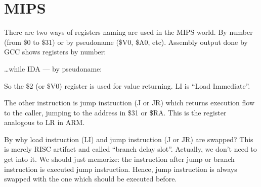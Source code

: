 
\ifdefined\IncludeMIPS
\ifx\RUSSIAN\undefined
\section{MIPS}

\label{MIPS_leaf_function_ex1}
There are two ways of registers naming are used in the MIPS world. By number (from \$0 to \$31)
or by pseudoname (\$V0, \$A0, etc).
Assembly output done by GCC shows registers by number:



\dots while IDA --- by pseudoname:



So the \$2 (or \$V0) register is used for value returning.
LI is ``Load Immediate''.

The other instruction is jump instruction (J or JR) which returns execution flow to the \gls{caller},
jumping to the address in \$31 or \$RA.
This is the register analogous to \ac{LR} in ARM.

By why load instruction (LI) and jump instruction (J or JR) are swapped?
This is merely \ac{RISC} artifact and called ``branch delay slot''.
Actually, we don't need to get into it. We should just memorize: the instruction after jump or branch instruction
is executed  jump instruction.
Hence, jump instruction is always swapped with the one which should be executed before.

\fi
\fi
